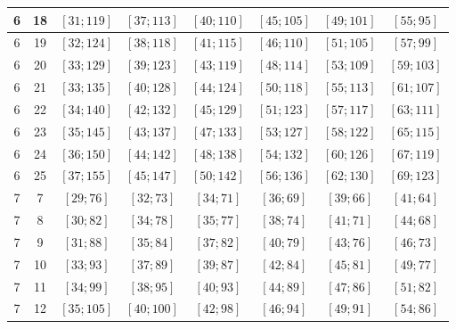 \documentclass[a4paper,12pt]{article}
\begin{document}
\begin{center}
{\begin{longtable}[H]{|c|c|c|c|c|c|c|c|}
6 &  18 &  $\left[ 31; 119\right]$ &  $\left[ 37; 113\right]$ &  $\left[ 40; 110\right]$ &  $\left[ 45; 105\right]$ &  $\left[ 49; 101\right]$ &  $\left[ 55; 95\right]$ \tabularnewline \hline
6 &  19 &  $\left[ 32; 124\right]$ &  $\left[ 38; 118\right]$ &  $\left[ 41; 115\right]$ &  $\left[ 46; 110\right]$ &  $\left[ 51; 105\right]$ &  $\left[ 57; 99\right]$ \tabularnewline \hline
6 &  20 &  $\left[ 33; 129\right]$ &  $\left[ 39; 123\right]$ &  $\left[ 43; 119\right]$ &  $\left[ 48; 114\right]$ &  $\left[ 53; 109\right]$ &  $\left[ 59; 103\right]$ \tabularnewline \hline
6 &  21 &  $\left[ 33; 135\right]$ &  $\left[ 40; 128\right]$ &  $\left[ 44; 124\right]$ &  $\left[ 50; 118\right]$ &  $\left[ 55; 113\right]$ &  $\left[ 61; 107\right]$ \tabularnewline \hline
6 &  22 &  $\left[ 34; 140\right]$ &  $\left[ 42; 132\right]$ &  $\left[ 45; 129\right]$ &  $\left[ 51; 123\right]$ &  $\left[ 57; 117\right]$ &  $\left[ 63; 111\right]$ \tabularnewline \hline
6 &  23 &  $\left[ 35; 145\right]$ &  $\left[ 43; 137\right]$ &  $\left[ 47; 133\right]$ &  $\left[ 53; 127\right]$ &  $\left[ 58; 122\right]$ &  $\left[ 65; 115\right]$ \tabularnewline \hline
6 &  24 &  $\left[ 36; 150\right]$ &  $\left[ 44; 142\right]$ &  $\left[ 48; 138\right]$ &  $\left[ 54; 132\right]$ &  $\left[ 60; 126\right]$ &  $\left[ 67; 119\right]$ \tabularnewline \hline
6 &  25 &  $\left[ 37; 155\right]$ &  $\left[ 45; 147\right]$ &  $\left[ 50; 142\right]$ &  $\left[ 56; 136\right]$ &  $\left[ 62; 130\right]$ &  $\left[ 69; 123\right]$ \tabularnewline \hline
7 &  7 &  $\left[ 29; 76\right]$ &  $\left[ 32; 73\right]$ &  $\left[ 34; 71\right]$ &  $\left[ 36; 69\right]$ &  $\left[ 39; 66\right]$ &  $\left[ 41; 64\right]$ \tabularnewline \hline
7 &  8 &  $\left[ 30; 82\right]$ &  $\left[ 34; 78\right]$ &  $\left[ 35; 77\right]$ &  $\left[ 38; 74\right]$ &  $\left[ 41; 71\right]$ &  $\left[ 44; 68\right]$ \tabularnewline \hline
7 &  9 &  $\left[ 31; 88\right]$ &  $\left[ 35; 84\right]$ &  $\left[ 37; 82\right]$ &  $\left[ 40; 79\right]$ &  $\left[ 43; 76\right]$ &  $\left[ 46; 73\right]$ \tabularnewline \hline
7 &  10 &  $\left[ 33; 93\right]$ &  $\left[ 37; 89\right]$ &  $\left[ 39; 87\right]$ &  $\left[ 42; 84\right]$ &  $\left[ 45; 81\right]$ &  $\left[ 49; 77\right]$ \tabularnewline \hline
7 &  11 &  $\left[ 34; 99\right]$ &  $\left[ 38; 95\right]$ &  $\left[ 40; 93\right]$ &  $\left[ 44; 89\right]$ &  $\left[ 47; 86\right]$ &  $\left[ 51; 82\right]$ \tabularnewline \hline
7 &  12 &  $\left[ 35; 105\right]$ &  $\left[ 40; 100\right]$ &  $\left[ 42; 98\right]$ &  $\left[ 46; 94\right]$ &  $\left[ 49; 91\right]$ &  $\left[ 54; 86\right]$ \tabularnewline \hline

\end{longtable}}
\end{center}
\end{document}
